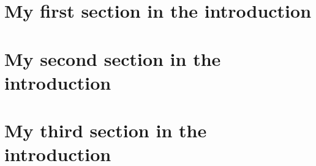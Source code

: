 
\section{My first section in the introduction}%
\label{sec:my_first_section_in_the_introduction}
\lipsum[1]

\section{My second section in the introduction}%
\label{sec:my_second_section_in_the_introduction}
\lipsum[2-4]

\section{My third section in the introduction}%
\label{sec:my_third_section_in_the_introduction}
\lipsum[2-4]


